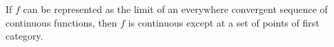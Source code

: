 If $f$ can be represented as the limit of an everywhere convergent sequence of continuous functions, then $f$ is continuous except at a set of points of first category.
